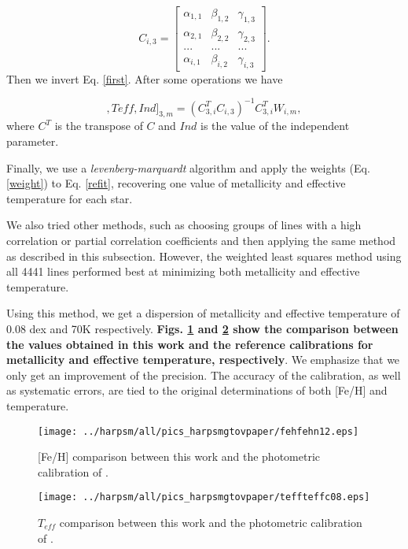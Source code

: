 \documentclass[structabstract]{aa}
\begin{document}
\begin{equation}
C_{i,3} = \left[\begin{array}{ccc} \alpha_{1,1} & \beta_{1,2} & \gamma_{1,3} \\ \alpha_{2,1} & \beta_{2,2} & \gamma_{2,3} \\... & ... & ...\\ \alpha_{i,1} & \beta_{i,2} & \gamma_{i,3} \end{array}\right].
\end{equation}
Then we invert Eq. \ref{first}. After some operations we have 

\begin{equation}
[[Fe/H],Teff,Ind]_{3,m} = (C^{T}_{3,i}C_{i,3})^{-1}C^{T}_{3,i}W_{i,m},
\label{refit}
\end{equation}
where $C^{T}$ is the transpose of $C$ and $Ind$ is the value of the independent parameter. 

Finally, we use a \textit{levenberg-marquardt} algorithm and apply the weights (Eq. \ref{weight}) to Eq. \ref{refit}, recovering one value of metallicity and effective temperature for each star.

We also tried other methods, such as choosing groups of lines with a high correlation or partial correlation coefficients and then applying the same method as described in this subsection. However, the weighted least squares method using all 4441 lines performed best at minimizing both metallicity and effective temperature.


Using this method, we get a dispersion of metallicity and effective temperature of 0.08 dex and 70K respectively. \textbf{Figs. \ref{fehfeh} and \ref{teffteff} show the comparison between the values obtained in this work and the reference calibrations for metallicity and effective temperature, respectively}. We emphasize that we only get an improvement of the precision. The accuracy of the calibration, as well as systematic errors, are tied to the original determinations of both [Fe/H] and temperature.

\begin{figure}[h]
\begin{center}
\texttt{[image: ../harpsm/all/pics\_harpsmgtovpaper/fehfehn12.eps]}
\end{center}
\caption{[Fe/H] comparison between this work and the photometric calibration of \citet{Neves-2012}.}
\label{fehfeh}
\end{figure}
%
%
\begin{figure}[h]
\begin{center}
\texttt{[image: ../harpsm/all/pics\_harpsmgtovpaper/teffteffc08.eps]}
\end{center}
\caption{$T_{eff}$ comparison between this work and the photometric calibration of \citet{Casagrande-2008}.}
\label{teffteff}
\end{figure}
\end{document}
